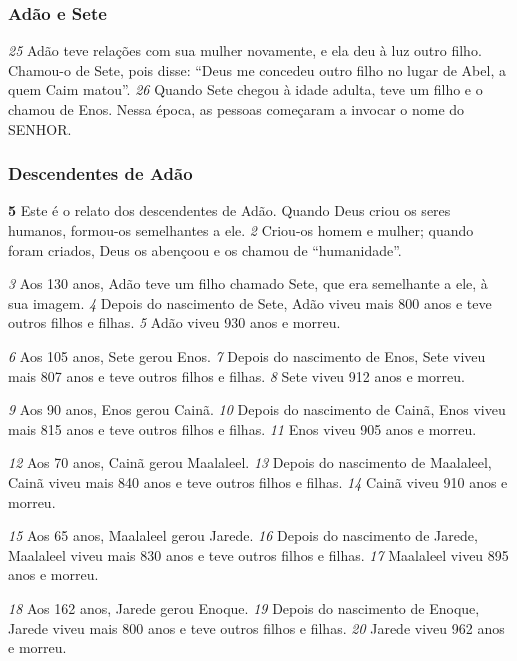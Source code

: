 \bigskip
\subsubsection*{Adão e Sete}
\textit{\tiny 25}
Adão teve relações com sua mulher novamente, e ela deu à luz outro filho.
Chamou-o de Sete, pois disse: “Deus me concedeu outro filho no lugar de Abel, a
quem Caim matou”.  
\textit{\tiny 26}
Quando Sete chegou à idade adulta, teve um filho e o
chamou de Enos. Nessa época, as pessoas começaram a invocar o nome do
SENHOR.

\bigskip
\subsubsection*{Descendentes de Adão}
\textbf{\large 5} 
Este é o relato dos descendentes de Adão. Quando Deus criou os seres
humanos, formou-os semelhantes a ele. 
\textit{\tiny 2}
Criou-os homem e mulher; quando
foram criados, Deus os abençoou e os chamou de “humanidade”.

\bigskip
\textit{\tiny 3}
Aos   130 anos, Adão teve um filho chamado Sete, que era semelhante a ele, à sua
 imagem. 
\textit{\tiny 4}
Depois do nascimento de Sete, Adão viveu mais 800 anos e teve outros
 filhos e filhas. 
\textit{\tiny 5}
Adão viveu 930 anos e morreu.

\bigskip
\textit{\tiny 6}
Aos 105 anos, Sete gerou Enos. 
\textit{\tiny 7}
Depois do nascimento de Enos, Sete viveu mais 807 anos e teve outros filhos e filhas. 
\textit{\tiny 8}
Sete viveu 912 anos e morreu.

\bigskip
\textit{\tiny 9}
Aos 90 anos, Enos gerou Cainã. 
\textit{\tiny 10}
Depois do nascimento de Cainã, Enos viveu mais 815 anos e teve outros filhos e filhas.  
\textit{\tiny 11}
Enos viveu 905 anos e morreu.

\bigskip
\textit{\tiny 12}
Aos 70 anos, Cainã gerou Maalaleel.  
\textit{\tiny 13}
Depois do nascimento de Maalaleel,
 Cainã viveu mais 840 anos e teve outros filhos e filhas.  
\textit{\tiny 14}
Cainã viveu 910 anos e morreu.

\bigskip
\textit{\tiny 15}
Aos 65 anos, Maalaleel gerou Jarede.  
\textit{\tiny 16}
Depois do nascimento de Jarede,
 Maalaleel viveu mais 830 anos e teve outros filhos e filhas.  
\textit{\tiny 17}
Maalaleel viveu 895 anos e morreu.

\bigskip
\textit{\tiny 18}
Aos 162 anos, Jarede gerou Enoque.  
\textit{\tiny 19}
Depois do nascimento de Enoque, Jarede
 viveu mais 800 anos e teve outros filhos e filhas.  
\textit{\tiny 20}
Jarede viveu 962 anos e
 morreu.

